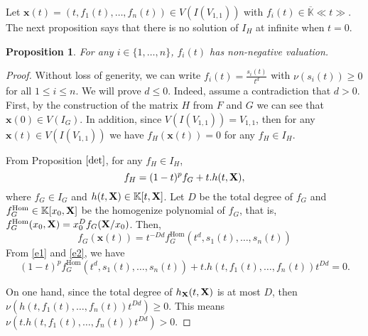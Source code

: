 \documentclass[11pt]{article}
\numberwithin{Property}{section}
\numberwithin{Theorem}{section}
\newtheorem{Proposition}{Proposition}%
\numberwithin{Proposition}{section}
\numberwithin{Lemma}{section}
\numberwithin{Corollary}{section}
\numberwithin{Definition}{section}
\numberwithin{Remark}{section}
\numberwithin{Conjecture}{section}
\numberwithin{Problem}{section}
\numberwithin{Example}{section}
\numberwithin{Claim}{section}
\renewcommand{\leq}{\leqslant}
\renewcommand{\ge}{\geqslant}
\def\bar{\overline}
\renewcommand{\ge}{\geqslant} %
\newcommand{\field}{\mathbb{K}} %
\newcommand{\mat}[1]{\mathbf{\MakeUppercase{#1}}} %
\begin{document}
Let $\mathbf{x}(t) = (t, f_1(t), \ldots, f_n(t)) \in V(I(V_{1,1}))$ with $f_i(t) \in \bar{\field}\ll t \gg$. The next proposition says that there is no solution of $I_H$ at infinite when $t = 0$. 
\begin{Proposition}
For any $i \in \{1, \ldots, n\}$, $f_i(t)$ has non-negative valuation. 
\end{Proposition}
\begin{proof}
Without loss of generity, we can write $f_i(t) = \frac{s_i(t)}{t^d}$ with $\nu(s_i(t)) \ge 0$ for all $1 \leq i \leq n$. We will prove $d \leq 0$. Indeed, assume a contradiction that $d > 0$. First, by the construction of the matrix $H$ from $F$ and $G$ we can see that $\mathbf{x}(0) \in V(I_G)$. In addition, since $V(I(V_{1,1})) = V_{1,1}$, then for any $\mathbf{x}(t) \in V(I(V_{1,1}))$ we have $f_H(\mathbf{x}(t)) = 0$ for any $f_H \in I_H$. 

From Proposition $\ref{det}$, for any $f_H \in I_H$, 
\begin{equation}\label{e1}
f_H = (1-t)^p f_G + t.h(t, \mat{X}),
\end{equation}
 where $f_G \in I_G$ and $h(t, \mat{X}) \in \field[t, \mat{X}]$. Let $D$ be the total degree of $f_G$ and $f_G^{\mathrm{Hom}} \in \field[x_0, \mat{X}]$ be the homogenize polynomial of $f_G$, that is, $f_G^{\mathrm{Hom}}(x_0, \mat{X}) = x_0^Df_G(\mat{X}/x_0)$. Then, 
 \begin{equation}\label{e2}
 f_G(\mathbf{x}(t)) = t^{-Dd}f_G^{\mathrm{Hom}}(t^d, s_1(t),\ldots, s_n(t)) 
 \end{equation}
From \cref{e1} and \cref{e2}, we have 
\[
(1-t)^pf_G^{\mathrm{Hom}}(t^d, s_1(t), \ldots, s_n(t))  + t.h(t, f_1(t), \ldots, f_n(t))t^{Dd} = 0.
\]

On one hand, since the total degree of $h_{\mat{X}}(t, \mat{X})$ is at most $D$, then $\nu(h(t, f_1(t), \ldots, f_n(t))t^{Dd}) \ge 0$. This means $\nu(t.h(t, f_1(t), \ldots, f_n(t))t^{Dd}) > 0$. 


\end{proof}
\end{document}
